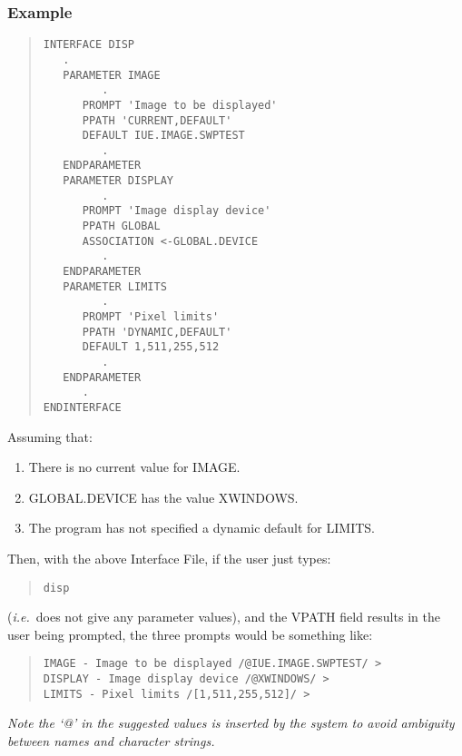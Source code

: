 \documentclass[twoside,11pt]{article}
\renewcommand{\_}{\texttt{\symbol{95}}}
\begin{document}
\subsubsection*{Example}
\begin{quote} \begin{verbatim}
INTERFACE DISP
   .
   PARAMETER IMAGE
         .
      PROMPT 'Image to be displayed'
      PPATH 'CURRENT,DEFAULT'
      DEFAULT IUE.IMAGE.SWPTEST
         .
   ENDPARAMETER
   PARAMETER DISPLAY
         .
      PROMPT 'Image display device'
      PPATH GLOBAL
      ASSOCIATION <-GLOBAL.DEVICE
         .
   ENDPARAMETER
   PARAMETER LIMITS
         .
      PROMPT 'Pixel limits'
      PPATH 'DYNAMIC,DEFAULT'
      DEFAULT 1,511,255,512
         .
   ENDPARAMETER
      .
ENDINTERFACE
\end{verbatim} \end{quote}
Assuming that:
\begin{enumerate}
\item There is no current value for IMAGE.
\item GLOBAL.DEVICE has the value XWINDOWS.
\item The program has not specified a dynamic default for LIMITS.
\end{enumerate}
Then, with the above Interface File, if the user just types:
\begin{quote} \begin{verbatim}
disp
\end{verbatim} \end{quote}
({\em i.e.}\ does not give any parameter values), and the VPATH field
results in the user being prompted, the three prompts would be something like:
\begin{quote} \begin{verbatim}
IMAGE - Image to be displayed /@IUE.IMAGE.SWPTEST/ >
DISPLAY - Image display device /@XWINDOWS/ >
LIMITS - Pixel limits /[1,511,255,512]/ >
\end{verbatim} \end{quote}
{\em Note the `@' in the suggested values is inserted by the system to avoid
ambiguity between names and character strings.}
\end{document}
